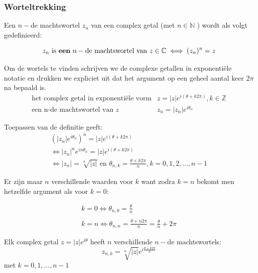 \subsubsection{Worteltrekking}

\begin{definitie}
	Een $n-$de machtswortel $z_n$ van een complex getal (met $n \in \mathbb{N}$ ) wordt als volgt gedefinieerd:\\

\begin{framed}
	\[  z_{n} \text{ is {\bf een} } n-\text{de machtswortel van } z \in \mathbb{C} \iff (z_{n})^n = z  \] 
\end{framed}
\end{definitie}

Om de wortels te vinden schrijven we de complexe getallen in exponenti\"{e}le notatie en drukken we expliciet uit dat het argument op een geheel aantal keer $2 \pi$ na bepaald is.\\

\[ \begin{array}{ll} 
\text{het complex getal in exponenti\"{e}le vorm} & z=|z|e^{i(\theta +k 2 \pi)}, k \in \mathbb{Z} \\
\text{een n-de machtswortel van } z & z_{n}=|z_{n}|e^{i \theta_{n}}
\end{array}
\]

Toepassen van de definitie geeft:\\

\[ \begin{array}{l}
(|z_{n}|e^{i \theta_{n}})^n = |z|e^{i(\theta + k 2 \pi)} \\
\iff |z_{n}|^n e^{i n \theta_{n}} = |z|e^{i(\theta + k 2 \pi)} \\ 
\iff |z_{n}|=\sqrt[n]{|z|} \text{ en } \theta_{n,k}=\frac{\theta + k 2 \pi}{n}, k=0,1,2,...,n-1 
\end{array} 
\]

Er zijn maar $n$ verschillende waarden voor $k$ want zodra $k=n$ bekomt men hetzelfde argument als voor $k=0$:

\[ \begin{array}{l}   
k=0 \iff \theta_{n,0}=\frac{\theta}{n} \\
\\
k=n \iff \theta_{n,n}=\frac{\theta + n 2\pi}{n}=\frac{\theta}{n} + 2\pi
\end{array}
\]

\begin{ftonthoud}
	
	Elk complex getal $z=|z|e^{i \theta}$ heeft $n$ verschillende $n-$de machtswortels:\\
	\[ z_{n,k}=\sqrt[n]{|z|}e^{i\frac{\theta+k2 \pi}{n}}  \] 
	met $k=0,1,...,n-1$

\end{ftonthoud}


